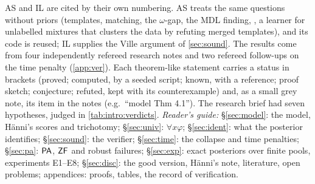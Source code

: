 AS and IL are cited by their own numbering. AS treats the same questions without priors (templates, matching, the $\omega$-gap, the MDL finding, \DTRC, a learner for unlabelled mixtures that clusters the data by refuting merged templates), and its code is reused; IL supplies the Ville argument of \cref{sec:sound}. The results come from four independently refereed research notes and two refereed follow-ups on the time penalty (\cref{app:ver}). Each theorem-like statement carries a status in brackets (proved; computed, by a seeded script; known, with a reference; proof sketch; conjecture; refuted, kept with its counterexample) and, as a small grey note, its item in the notes (e.g.\ ``model Thm 4.1''). The research brief had seven hypotheses, judged in \cref{tab:intro:verdicts}. \emph{Reader's guide:} \S\ref{sec:model}: the model, H\"anni's scores and trichotomy; \S\ref{sec:univ}: $\forall x\varphi$; \S\ref{sec:ident}: what the posterior identifies; \S\ref{sec:sound}: the verifier; \S\ref{sec:time}: the collapse and time penalties; \S\ref{sec:pa}: $\mathsf{PA}$, $\mathsf{ZF}$ and robust failures; \S\ref{sec:exp}: exact posteriors over finite pools, experiments E1--E8; \S\ref{sec:disc}: the good version, H\"anni's note, literature, open problems; appendices: proofs, tables, the record of verification.

